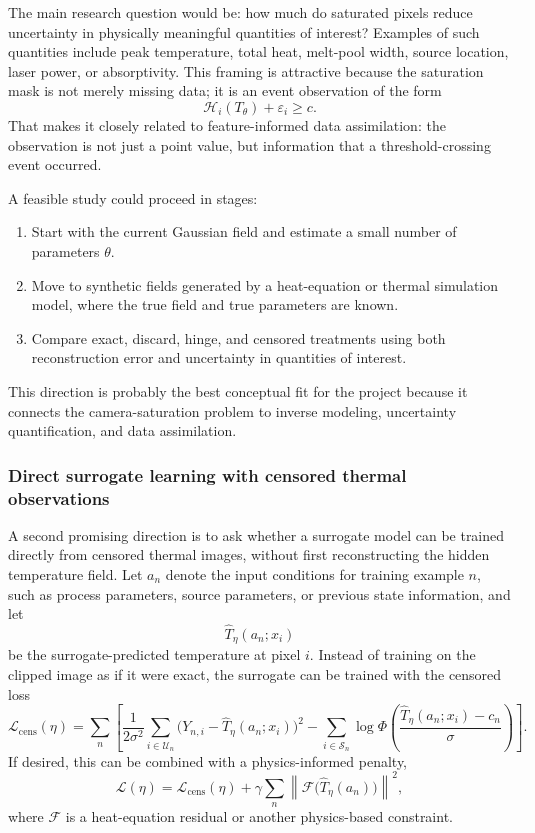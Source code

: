 The main research question would be: how much do saturated pixels reduce
uncertainty in physically meaningful quantities of interest?
Examples of such quantities include peak temperature, total heat, melt-pool
width, source location, laser power, or absorptivity.  This framing is attractive
because the saturation mask is not merely missing data; it is an event
observation of the form
\[
    \mathcal H_i(T_\theta)+\varepsilon_i \geq c.
\]
That makes it closely related to feature-informed data assimilation: the
observation is not just a point value, but information that a threshold-crossing
event occurred.

A feasible study could proceed in stages:
\begin{enumerate}
    \item Start with the current Gaussian field and estimate a small number of
    parameters $\theta$.
    \item Move to synthetic fields generated by a heat-equation or thermal
    simulation model, where the true field and true parameters are known.
    \item Compare exact, discard, hinge, and censored treatments using both
    reconstruction error and uncertainty in quantities of interest.
\end{enumerate}
This direction is probably the best conceptual fit for the project because it
connects the camera-saturation problem to inverse modeling, uncertainty
quantification, and data assimilation.

\subsubsection{Direct surrogate learning with censored thermal observations}

A second promising direction is to ask whether a surrogate model can be trained
directly from censored thermal images, without first reconstructing the hidden
temperature field.  Let $a_n$ denote the input conditions for training example
$n$, such as process parameters, source parameters, or previous state
information, and let
\[
    \widehat T_\eta(a_n;x_i)
\]
be the surrogate-predicted temperature at pixel $i$.  Instead of training on the
clipped image as if it were exact, the surrogate can be trained with the censored
loss
\[
    \mathcal L_{\mathrm{cens}}(\eta)
    =
    \sum_n
    \left[
    \frac{1}{2\sigma^2}\sum_{i\in\mathcal U_n}
        \bigl(Y_{n,i}-\widehat T_\eta(a_n;x_i)\bigr)^2
    -
    \sum_{i\in\mathcal S_n}
        \log \Phi\!\left(
        \frac{\widehat T_\eta(a_n;x_i)-c_n}{\sigma}
        \right)
    \right].
\]
If desired, this can be combined with a physics-informed penalty,
\[
    \mathcal L(\eta)
    =
    \mathcal L_{\mathrm{cens}}(\eta)
    +
    \gamma\sum_n
    \left\|\mathcal F\bigl(\widehat T_\eta(a_n)\bigr)\right\|^2,
\]
where $\mathcal F$ is a heat-equation residual or another physics-based
constraint.

